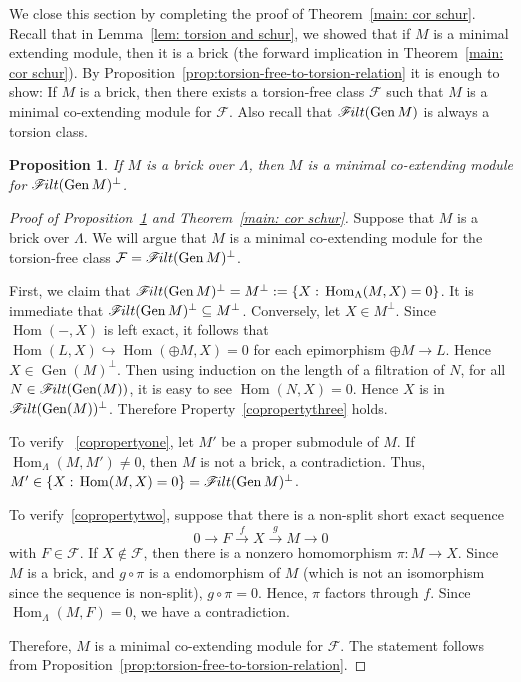 \documentclass[10pt]{amsart}
\providecommand{\1}{}
\DeclareMathOperator{\Hom}{Hom}
\newcommand{\calF}{\mathcal{F}}
\newcommand{\filt}{\mathscr{F}\Mk ilt}
\newcommand{\Gen}{\operatorname{Gen}}
\renewcommand{\1}{\hat{1}}
\newcommand{\0}{\hat{0}}
\newcommand*{\Mk}{\mkern -2mu}
\newtheorem{proposition}[theorem]{Proposition}
\theoremstyle{definition}
\begin{document}
We close this section by completing the proof of Theorem~\ref{main: cor schur}.
Recall that in Lemma~\ref{lem: torsion and schur}, we showed that if
$M$ is a minimal extending module, then it is a brick (the forward implication in Theorem~\ref{main: cor schur}).
By Proposition~\ref{prop:torsion-free-to-torsion-relation} it is enough to show:
If $M$ is a brick, then there exists a torsion-free class $\calF$ such that $M$ is a minimal co-extending module for $\calF$. Also recall that $\filt(\Gen M)$ is always a torsion class. 
\begin{proposition}\label{if part}
If $M$ is a brick over $\Lambda$, then $M$ is a minimal co-extending module for $\filt(\Gen M)^{\perp}$.
\end{proposition}
\begin{proof}[Proof of Proposition~\ref{if part} and Theorem~\ref{main: cor schur}]

Suppose that $M$ is a brick over $\Lambda$. We will argue that $M$ is a minimal co-extending module for the torsion-free class $\calF=\filt(\Gen M)^\perp$.

First, we claim that $\filt(\Gen M)^\perp= M^\perp:=\{X:\,\Hom_\Lambda(M, X)=0\}$.
It is immediate that $\filt(\Gen M)^\perp \subseteq M^\perp$. Conversely, let $X\in M^\perp$. Since $\Hom(-,X)$ is left exact, it follows that $\Hom(L,X)\hookrightarrow \Hom(\oplus M,X)=0$ for each epimorphism $\oplus M\rightarrow L$. Hence $ X\in \Gen(M)^\perp $. Then using induction on the length of a filtration of $N$, for all $N\in\filt(\Gen(M))$, it is easy to see $\Hom(N,X)=0$. Hence $X$ is in $\filt(\Gen(M))^\perp$.
Therefore Property~\ref{copropertythree} holds.

To verify ~\ref{copropertyone}, let $M'$ be a proper submodule of
$M$. If $\Hom_\Lambda(M,M')\neq 0$, then $M$ is not a brick, a contradiction. Thus, $M'\in\{X:\,\Hom(M,X)=0\}=\filt(\Gen M)^\perp$. 

To verify~\ref{copropertytwo}, suppose that there is a non-split short exact sequence \[ 0\rightarrow F \xrightarrow{f} X
\xrightarrow{g} M \rightarrow 0\] with $F\in \calF$.
If $X\notin \calF$, then there is a nonzero homomorphism $\pi: M\rightarrow X$.
Since $M$ is a brick, and $g\circ \pi$ is a endomorphism of $M$ (which is not an isomorphism since the sequence is non-split), $g\circ \pi=0$. 
Hence, $\pi$ factors through $f$.
Since $\Hom_\Lambda(M,F)=0$, we have a contradiction.

Therefore, $M$ is a minimal co-extending module for $\calF$.
The statement follows from Proposition~\ref{prop:torsion-free-to-torsion-relation}.
\end{proof}
\end{document}
